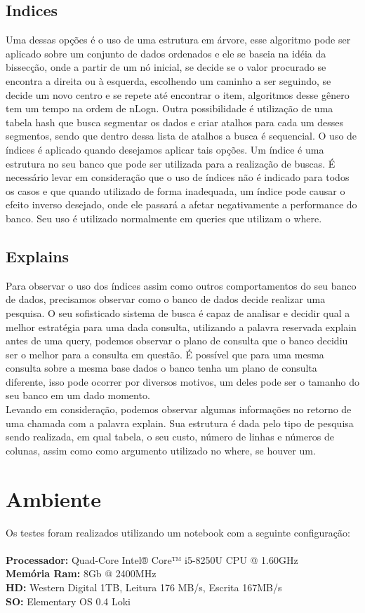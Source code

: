 \documentclass[12pt, a4paper, twoside, titlepage]{article}
\begin{document}
\subsection{Indices}
Uma dessas opções é o uso de uma estrutura em árvore, esse algoritmo pode ser aplicado sobre um conjunto de dados ordenados e ele se baseia na idéia da bissecção, onde a partir de um nó inicial, se decide se o valor procurado se encontra a direita ou à esquerda, escolhendo um caminho a ser seguindo, se decide um novo centro e se repete até encontrar o item, algoritmos desse gênero tem um tempo na ordem de nLogn. Outra possibilidade é utilização de uma tabela hash que busca segmentar os dados e criar atalhos para cada um desses segmentos, sendo que dentro dessa lista de atalhos a busca é sequencial. O uso de índices é aplicado quando desejamos aplicar tais opções. Um índice é uma estrutura no seu banco que pode ser utilizada para a realização de buscas. É necessário levar em consideração que o uso de índices não é indicado para todos os casos e que quando utilizado de forma inadequada, um índice pode causar o efeito inverso desejado, onde ele passará a afetar negativamente a performance do banco. Seu uso é utilizado normalmente em queries que utilizam o where.
\subsection{Explains}
Para observar o uso dos índices assim como outros comportamentos do seu banco de dados, precisamos observar como o banco de dados decide realizar uma pesquisa. O seu sofisticado sistema de busca é capaz de analisar e decidir qual a melhor estratégia para uma dada consulta, utilizando a palavra reservada explain antes de uma query, podemos observar o plano de consulta que o banco decidiu ser o melhor para a consulta em questão. É possível que para uma mesma consulta sobre a mesma base dados o banco tenha um plano de consulta diferente, isso pode ocorrer por diversos motivos, um deles pode ser o tamanho do seu banco em um dado momento.
\\Levando em consideração, podemos observar algumas informações no retorno de uma chamada com a palavra explain. Sua estrutura é dada pelo tipo de pesquisa sendo realizada, 	em qual tabela, o seu custo, número de linhas e números de colunas, assim como como argumento utilizado no where, se houver um.

\section{Ambiente}
Os testes foram realizados utilizando um notebook com a seguinte configuração:\\\\
\textbf{\textbf{}Processador:} Quad-Core Intel® Core™ i5-8250U CPU @ 1.60GHz\\ 
\textbf{\textbf{}Memória Ram:} 8Gb @ 2400MHz\\
\textbf{HD:} Western Digital 1TB, Leitura 176 MB/s, Escrita 167MB/s\\
\textbf{SO:} Elementary OS 0.4 Loki 
\end{document}
